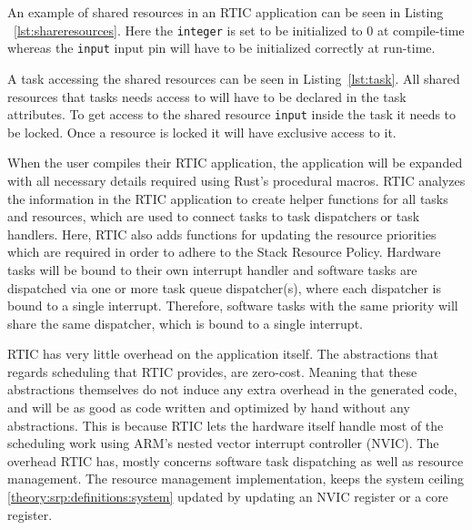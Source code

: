 An example of shared resources in an RTIC application can be seen in Listing
~\ref{lst:shareresources}. Here the \texttt{integer} is set to be initialized to
$0$ at compile-time whereas the \texttt{input} input pin will have to be initialized
correctly at run-time.


A task accessing the shared resources can be seen in Listing~\ref{lst:task}.
All shared resources that tasks needs access to will have to be declared in the
task attributes. To get access to the shared resource \texttt{input} inside the
task it needs to be locked. Once a resource is locked it will have exclusive
access to it.


When the user compiles their RTIC application, the application will be expanded
with all necessary details required using Rust's procedural macros. RTIC analyzes
the information in the RTIC application to create helper functions for all
tasks and resources, which are used to connect tasks to task dispatchers or
task handlers. Here, RTIC also adds functions for updating the resource
priorities which are required in order to adhere to the Stack Resource Policy.
Hardware tasks will be bound to their own interrupt handler and software tasks
are dispatched via one or more task queue dispatcher(s), where each dispatcher is
bound to a single interrupt. Therefore, software tasks with the same priority
will share the same dispatcher, which is bound to a single interrupt.

RTIC has very little overhead on the application itself. The abstractions that
regards scheduling that RTIC provides, are zero-cost. Meaning that these
abstractions themselves do not induce any extra overhead in the generated
code, and will be as good as code written and optimized by hand without any
abstractions. This is because RTIC lets the hardware itself handle most of the
scheduling work using ARM's nested vector interrupt controller (NVIC). The
overhead RTIC has, mostly concerns software task dispatching as well as
resource management. The resource management implementation, keeps the system
ceiling \ref{theory:srp:definitions:system} updated by updating an NVIC
register or a core register.


